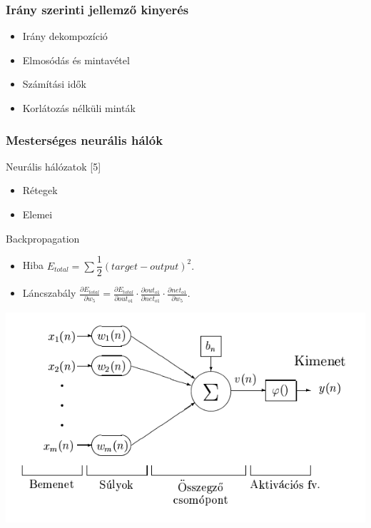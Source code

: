 \documentclass{beamer}
\begin{document}
\begin{frame}[fragile]
\frametitle{Irány szerinti jellemző kinyerés}

\begin{itemize}
\item Irány dekompozíció
\item Elmosódás és mintavétel
\item Számítási idők
\item Korlátozás nélküli minták
\end{itemize}

\end{frame}

\begin{frame}[fragile]
\frametitle{Mesterséges neurális hálók}

Neurális hálózatok [5]
\begin{itemize}
\item Rétegek
\item Elemei
\end{itemize}

Backpropagation
\begin{itemize}
\item Hiba $E_{total} = \sum \dfrac{1}{2}(target - output)^2.$
\item Láncszabály $\frac{\partial E_{total}}{\partial w_{5}} = \frac{\partial E_{total}}{\partial out_{o1}} \cdot \frac{\partial out_{o1}}{\partial net_{o1}} \cdot \frac{\partial net_{o1}}{\partial w_{5}}.$
\end{itemize}

\includegraphics[scale=0.4, center]{ANNParts}

\end{frame}
\end{document}
